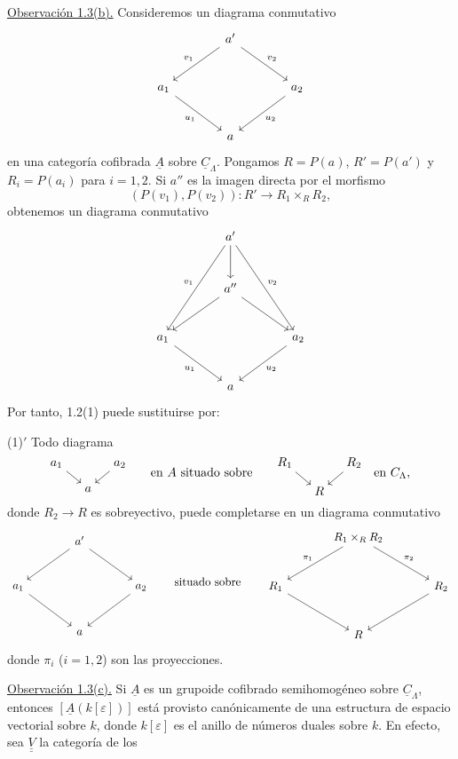 \underline{Observación 1.3(b).} Consideremos un diagrama conmutativo
\[
\begin{tikzcd}[row sep=large,column sep=large]
& a' \arrow[dl,"v_1"'] \arrow[dr,"v_2"] & \\
a_1 \arrow[dr,"u_1"'] & & a_2 \arrow[dl,"u_2"] \\
& a &
\end{tikzcd}
\]
en una categoría cofibrada $\underline A$ sobre
$\underline C_\Lambda$. Pongamos $R=P(a)$, $R'=P(a')$ y
$R_i=P(a_i)$ para $i=1,2$. Si $a''$ es la imagen directa por el morfismo
\[
 (P(v_1),P(v_2)):R'\longrightarrow R_1\times_RR_2,
\]
obtenemos un diagrama conmutativo
\[
\begin{tikzcd}[row sep=large,column sep=large]
& a' \arrow[d] \arrow[ddl,"v_1"'] \arrow[ddr,"v_2"] & \\
& a'' \arrow[dl] \arrow[dr] & \\
a_1 \arrow[dr,"u_1"'] & & a_2 \arrow[dl,"u_2"] \\
& a &
\end{tikzcd}
\]
Por tanto, 1.2(1) puede sustituirse por:

(1)$'$ Todo diagrama
\[
\begin{tikzcd}[cramped,column sep=small,row sep=small]
a_1 \arrow[dr] & & a_2 \arrow[dl] \\
& a &
\end{tikzcd}
\qquad\text{en }\underline A\text{ situado sobre}\qquad
\begin{tikzcd}[cramped,column sep=small,row sep=small]
R_1 \arrow[dr] & & R_2 \arrow[dl] \\
& R &
\end{tikzcd}
\quad\text{en }\underline C_\Lambda,
\]
donde $R_2\longrightarrow R$ es sobreyectivo, puede completarse en un
diagrama conmutativo
\[
\begin{tikzcd}[row sep=large,column sep=large]
& a' \arrow[dl] \arrow[dr] & \\
a_1 \arrow[dr] & & a_2 \arrow[dl] \\
& a &
\end{tikzcd}
\qquad\text{situado sobre}\qquad
\begin{tikzcd}[row sep=large,column sep=large]
& R_1\times_RR_2 \arrow[dl,"\pi_1"'] \arrow[dr,"\pi_2"] & \\
R_1 \arrow[dr] & & R_2 \arrow[dl] \\
& R &
\end{tikzcd}
\]
donde $\pi_i$ ($i=1,2$) son las proyecciones.

\underline{Observación 1.3(c).} Si $\underline A$ es un grupoide
cofibrado semihomogéneo sobre $\underline C_\Lambda$, entonces
$[\underline A(k[\varepsilon])]$ está provisto canónicamente de una
estructura de espacio vectorial sobre $k$, donde $k[\varepsilon]$ es el
anillo de números duales sobre $k$. En efecto, sea
$\underline{\underline V}$ la categoría de los

